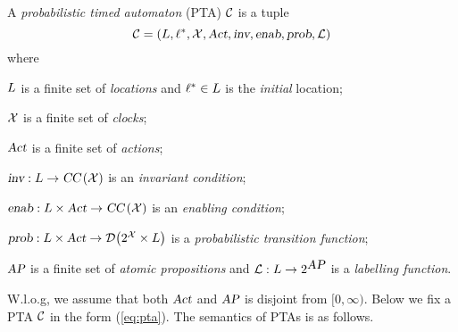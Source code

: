 \begin{definition}
A \emph{probabilistic timed automaton} (PTA) $\mathcal{C}$ is a tuple
\begin{equation}\label{eq:pta}
\mathcal{C}=\left(L, \ell^*, \mathcal{X}, \mbox{\sl Act}, \mbox{\sl inv}, \mbox{\sl enab},  \mbox{\sl prob}, \mathcal{L}\right)
\end{equation}
where
\begin{compactitem}
\item $L$ is a finite set of \emph{locations} and $\ell^*\in L$ is the \emph{initial} location;
\item $\mathcal{X}$ is a finite set of \emph{clocks};
\item $\mbox{\sl Act}$ is a finite set of \emph{actions};
\item $\mbox{\sl inv}:L\rightarrow\mbox{\sl CC}\left(\mathcal{X}\right)$ is
an \emph{invariant condition};
\item $\mbox{\sl enab}:L\times\mbox{\sl Act}\rightarrow\mbox{\sl CC}\left(\mathcal{X}\right)$ is an \emph{enabling condition};
\item $\mbox{\sl prob}:L\times\mbox{\sl Act}\rightarrow{\mathcal{D}}{\left(2^{\mathcal{X}}\times L\right)}$ is a \emph{probabilistic transition function};
\item $\mbox{\sl AP}$ is a finite set of \emph{atomic propositions} and $\mathcal{L}:L\rightarrow 2^{\mbox{\sl AP}}$ is a \emph{labelling function}.
\end{compactitem}
\end{definition}
% 
W.l.o.g, we assume that both $\mbox{\sl Act}$ and $\mbox{\sl AP}$ is disjoint from $[0,\infty)$. Below we fix a PTA $\mathcal{C}$ in the form (\ref{eq:pta}). The semantics of PTAs is as follows.

